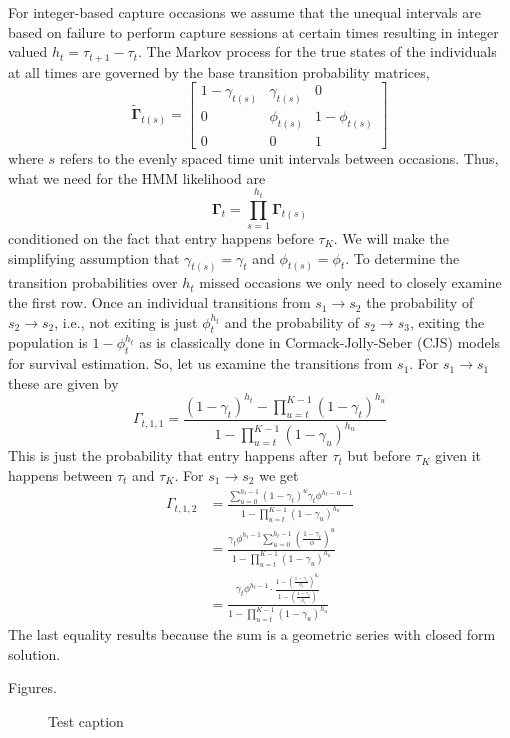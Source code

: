 \documentclass[12pt]{article}
\newcommand{\bG}{\ensuremath{\boldsymbol{\Gamma}}}
\begin{document}
For integer-based capture occasions we assume that the unequal intervals are based on failure to perform capture sessions at certain times resulting in integer valued $h_t = \tau_{t+1}-\tau_t$. The Markov process for the true states of the individuals at all times are governed by the base transition probability matrices,
\[
\tilde{\bG}_{t(s)} = \left[
\begin{array}{ccc}
1-\gamma_{t(s)} & \gamma_{t(s)} & 0 \\
0 & \phi_{t(s)} & 1-\phi_{t(s)} \\
0 & 0 & 1
\end{array} 
\right]
\]
where $s$ refers to the evenly spaced time unit intervals between occasions. Thus, what we need for the HMM likelihood are
\[
\bG_t = \prod_{s=1}^{h_t} \bG_{t(s)}
\]
conditioned on the fact that entry happens before $\tau_K$. We will make the simplifying assumption that $\gamma_{t(s)} = \gamma_t$ and $\phi_{t(s)} = \phi_t$. To determine the transition probabilities over $h_t$ missed occasions we only need to closely examine the first row. Once an individual transitions from $s_1 \to s_2$ the probability of $s_2 \to s_2$, i.e., not exiting is just $\phi_t^{h_t}$ and the probability of $s_2 \to s_3$, exiting the population is $1-\phi_t^{h_t}$ as is classically done in Cormack-Jolly-Seber (CJS) models for survival estimation. So, let us examine the transitions from $s_1$. For $s_1 \to s_1$ these are given by
\[
\Gamma_{t,1,1} = \frac{ (1-\gamma_t)^{h_t} - \prod_{u=t}^{K-1}(1-\gamma_t)^{h_u}}{1 - \prod_{u=t}^{K-1}(1-\gamma_u)^{h_u}}
\]
This is just the probability that entry happens after $\tau_t$ but before $\tau_K$ given it happens between $\tau_t$ and $\tau_K$. For $s_1 \to s_2$ we get
\[
\begin{aligned}
\Gamma_{t,1,2} &= \frac{\sum_{u=0}^{h_t-1} (1-\gamma_t)^u \gamma_t \phi^{h_t-u-1} }{1 - \prod_{u=t}^{K-1}(1-\gamma_u)^{h_u}} \\
&= \frac{\gamma_t \phi^{h_t-1} \sum_{u=0}^{h_t-1} \left(\frac{1-\gamma_t}{\phi}\right)^u }{1 - \prod_{u=t}^{K-1}(1-\gamma_u)^{h_u}} \\
&= \frac{\gamma_t \phi^{h_t-1} \cdot \frac{1-\left(\frac{1-\gamma_t}{\phi_t}\right)^{h_t}}{1-\left(\frac{1-\gamma_t}{\phi_t}\right)}}{1 - \prod_{u=t}^{K-1}(1-\gamma_u)^{h_u}}
\end{aligned}
\]
The last equality results because the sum is a geometric series with closed form solution. 




\clearpage


Figures.

\begin{figure}
\caption{Test caption}
\end{figure}
\end{document}

